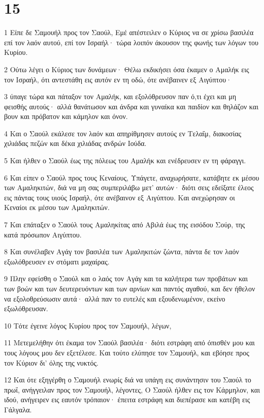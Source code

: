 \chapter{15}

\par 1 Είπε δε Σαμουήλ προς τον Σαούλ, Εμέ απέστειλεν ο Κύριος να σε χρίσω βασιλέα επί τον λαόν αυτού, επί τον Ισραήλ· τώρα λοιπόν άκουσον της φωνής των λόγων του Κυρίου.
\par 2 Ούτω λέγει ο Κύριος των δυνάμεων· Θέλω εκδικήσει όσα έκαμεν ο Αμαλήκ εις τον Ισραήλ, ότι αντεστάθη εις αυτόν εν τη οδώ, ότε ανέβαινεν εξ Αιγύπτου·
\par 3 ύπαγε τώρα και πάταξον τον Αμαλήκ, και εξολόθρευσον παν ό,τι έχει και μη φεισθής αυτούς· αλλά θανάτωσον και άνδρα και γυναίκα και παιδίον και θηλάζον και βουν και πρόβατον και κάμηλον και όνον.
\par 4 Και ο Σαούλ εκάλεσε τον λαόν και απηρίθμησεν αυτούς εν Τελαΐμ, διακοσίας χιλιάδας πεζών και δέκα χιλιάδας ανδρών Ιούδα.
\par 5 Και ήλθεν ο Σαούλ έως της πόλεως του Αμαλήκ και ενέδρευσεν εν τη φάραγγι.
\par 6 Και είπεν ο Σαούλ προς τους Κεναίους, Υπάγετε, αναχωρήσατε, κατάβητε εκ μέσου των Αμαληκιτών, διά να μη σας συμπεριλάβω μετ' αυτών· διότι σεις εδείξατε έλεος εις πάντας τους υιούς Ισραήλ, ότε ανέβαινον εξ Αιγύπτου. Και ανεχώρησαν οι Κεναίοι εκ μέσου των Αμαληκιτών.
\par 7 Και επάταξεν ο Σαούλ τους Αμαληκίτας από Αβιλά έως της εισόδου Σούρ, της κατά πρόσωπον Αιγύπτου.
\par 8 Και συνέλαβεν Αγάγ τον βασιλέα των Αμαληκιτών ζώντα, πάντα δε τον λαόν εξωλόθρευσεν εν στόματι μαχαίρας.
\par 9 Πλην εφείσθη ο Σαούλ και ο λαός τον Αγάγ και τα καλήτερα των προβάτων και των βοών και των δευτερευόντων και των αρνίων και παντός αγαθού, και δεν ήθελον να εξολοθρεύσωσιν αυτά· αλλά παν το ευτελές και εξουδενωμένον, εκείνο εξωλόθρευσαν.
\par 10 Τότε έγεινε λόγος Κυρίου προς τον Σαμουήλ, λέγων,
\par 11 Μετεμελήθην ότι έκαμα τον Σαούλ βασιλέα· διότι εστράφη από όπισθέν μου και τους λόγους μου δεν εξετέλεσε. Και τούτο ελύπησε τον Σαμουήλ, και εβόησε προς τον Κύριον δι' όλης της νυκτός.
\par 12 Και ότε εξηγέρθη ο Σαμουήλ ενωρίς διά να υπάγη εις συνάντησιν του Σαούλ το πρωΐ, ανήγγειλαν προς τον Σαμουήλ, λέγοντες, Ο Σαούλ ήλθεν εις τον Κάρμηλον, και ιδού, ανήγειρεν εις εαυτόν τρόπαιον· έπειτα εστράφη και διεπέρασε και κατέβη εις Γάλγαλα.
